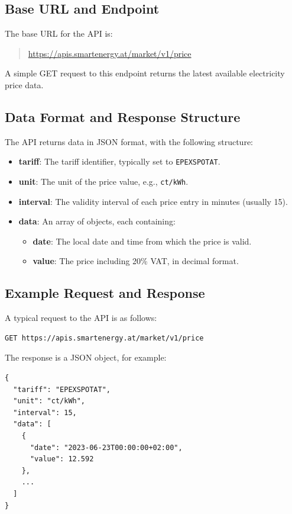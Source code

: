 \subsection{Base URL and Endpoint}
The base URL for the API is:
\begin{quote}
    \url{https://apis.smartenergy.at/market/v1/price}
\end{quote}
A simple GET request to this endpoint returns the latest available electricity price data.

\subsection{Data Format and Response Structure}
The API returns data in JSON format, with the following structure:
\begin{itemize}
    \item \textbf{tariff}: The tariff identifier, typically set to \texttt{EPEXSPOTAT}.
    \item \textbf{unit}: The unit of the price value, e.g., \texttt{ct/kWh}.
    \item \textbf{interval}: The validity interval of each price entry in minutes (usually 15).
    \item \textbf{data}: An array of objects, each containing:
    \begin{itemize}
        \item \textbf{date}: The local date and time from which the price is valid.
        \item \textbf{value}: The price including 20\% VAT, in decimal format.
    \end{itemize}
\end{itemize}

\subsection{Example Request and Response}
A typical request to the API is as follows:
\begin{lstlisting}
GET https://apis.smartenergy.at/market/v1/price
\end{lstlisting}

The response is a JSON object, for example:
\begin{lstlisting}
{
  "tariff": "EPEXSPOTAT",
  "unit": "ct/kWh",
  "interval": 15,
  "data": [
    {
      "date": "2023-06-23T00:00:00+02:00",
      "value": 12.592
    },
    ...
  ]
}
\end{lstlisting}

